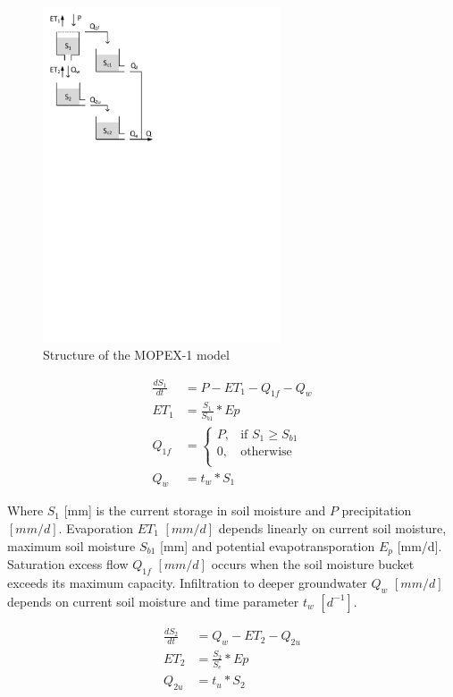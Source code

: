 { 																	%
\begin{figure}
\includegraphics[trim=1cm 18cm 7cm 1cm,width=7cm,keepaspectratio]{./AppA_files/24_schematic.pdf}
\caption{Structure of the MOPEX-1 model} \label{fig:24_schematic}
\end{figure}

\begin{align}
	\frac{dS_1}{dt} &= P-ET_1-Q_{1f}-Q_w \\
	ET_1 &= \frac{S_1}{S_{b1}}*Ep\\
	Q_{1f} &= \begin{cases}
		P, &\text{if } S_1 \geq S_{b1} \\
		0, & \text{otherwise} \\
	\end{cases} \\
	Q_w &= t_w*S_1
\end{align}

Where $S_1$ [mm] is the current storage in soil moisture and $P$ precipitation $[mm/d]$. Evaporation $ET_1$ $[mm/d]$ depends linearly on current soil moisture, maximum soil moisture $S_{b1}$ [mm] and potential evapotransporation $E_p$ [mm/d]. Saturation excess flow $Q_{1f}$  $[mm/d]$ occurs when the soil moisture bucket exceeds its maximum capacity. Infiltration to deeper groundwater $Q_w$  $[mm/d]$ depends on current soil moisture and time parameter $t_w$  $[d^{-1}]$.

} %

\begin{align}
	\frac{dS_2}{dt} &= Q_w-ET_2-Q_{2u}\\
	ET_2 &= \frac{S_2}{S_{e}}*Ep\\
	Q_{2u} &= t_u*S_2
\end{align}

